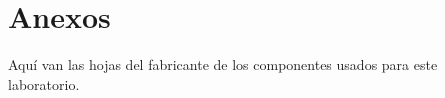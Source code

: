  \section{Anexos}
 Aquí van las hojas del fabricante de los componentes usados para este laboratorio. 

%
%  
%  
%  
%
